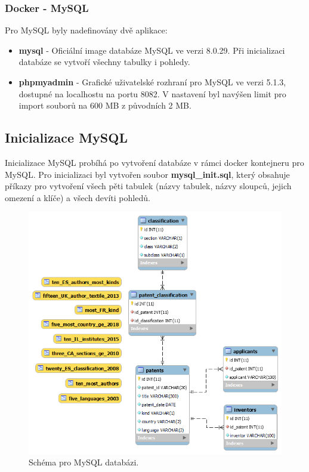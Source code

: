 \subsubsection{Docker - MySQL}
Pro MySQL byly nadefinovány dvě aplikace:
\begin{itemize}
\item \textbf{mysql} - Oficiální image databáze MySQL ve verzi 8.0.29. Při inicializaci databáze se vytvoří všechny tabulky i pohledy.
\item \textbf{phpmyadmin} - Grafické uživatelské rozhraní pro MySQL ve verzi 5.1.3, dostupné na localhostu na portu 8082. V nastavení byl navýšen limit pro import souborů na 600 MB z původních 2 MB.
\end{itemize}

\subsection{Inicializace MySQL}
Inicializace MySQL probíhá po vytvoření databáze v rámci docker kontejneru pro MySQL. Pro inicializaci byl vytvořen soubor \textbf{mysql\_init.sql}, který obsahuje příkazy pro vytvoření všech pěti tabulek (názvy tabulek, názvy sloupců, jejich omezení a klíče) a všech devíti pohledů.
\begin{figure}[H]
\centering
\includegraphics[width=12cm]{img/eer}
\caption{Schéma pro MySQL databázi.}
\label{fig:mysql_schema}
\end{figure}

